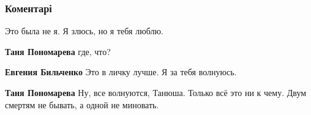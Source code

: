  
 
 
 
 
\subsubsection{Коментарі}

\begin{itemize}
 
Это была не я. Я злюсь, но я тебя люблю.
\begin{itemize}
 
\textbf{Таня Пономарева} где, что?

 
\textbf{Евгения Бильченко} Это в личку лучше. Я за тебя волнуюсь.

 
\textbf{Таня Пономарева} Ну, все волнуются, Танюша. Только всё это ни к чему. Двум смертям не бывать, а одной не миновать.

 

\end{itemize}
\end{itemize}

